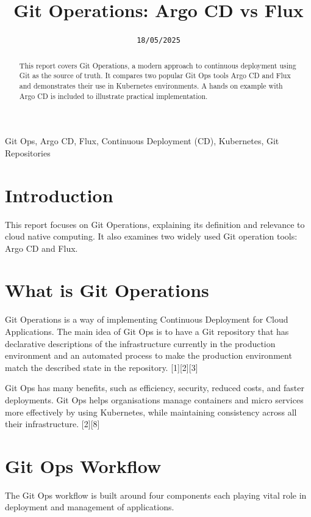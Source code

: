 \documentclass[conference]{IEEEtran}
\begin{document}
\title{Git Operations: Argo CD vs Flux\\}

\author{
\and
{}
\texttt{18/05/2025}
\and
{}
}
\maketitle

\begin{abstract}
This report covers Git Operations, a modern approach to continuous deployment using Git as the source of truth. It compares two popular Git Ops tools Argo CD and Flux and demonstrates their use in Kubernetes environments. A hands on example with Argo CD is included to illustrate practical implementation.
\end{abstract}

\begin{IEEEkeywords}
Git Ops, Argo CD, Flux, Continuous Deployment (CD), Kubernetes, Git Repositories 
\end{IEEEkeywords}

\section{Introduction}
This report focuses on Git Operations, explaining its definition and relevance to cloud native computing. It also examines two widely used Git operation tools: Argo CD and Flux.

\section{What is Git Operations}
Git Operations is a way of implementing Continuous Deployment for Cloud Applications. The main idea of Git Ops is to have a Git repository that has declarative descriptions of the infrastructure currently in the production environment and an automated process to make the production environment match the described state in the repository. [1][2][3]

Git Ops has many benefits, such as efficiency, security, reduced costs, and faster deployments. Git Ops helps organisations manage containers and micro services more effectively by using Kubernetes, while maintaining consistency across all their infrastructure. [2][8]

\section{Git Ops Workflow}
The Git Ops workflow is built around four components each playing vital role in deployment and management of applications.
\end{document}
